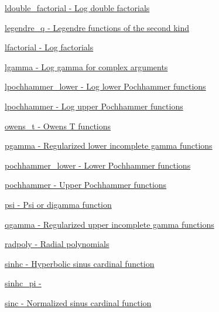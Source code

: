 \begin{DoxyItemize}
\item \hyperlink{group__gnu__math__spec__func_ga31ca8e7a5b1f5c883e727ed9c053edd8}{ldouble\+\_\+factorial -\/ Log double factorials}
\item \hyperlink{group__gnu__math__spec__func_ga4ad68133a4ff354cb99e4d3608ce6e4d}{legendre\+\_\+q -\/ Legendre functions of the second kind}
\item \hyperlink{group__gnu__math__spec__func_gaee28cc03db944a3e02fd10542016cfa8}{lfactorial -\/ Log factorials}
\item \hyperlink{group__gnu__math__spec__func_gaf70747491390b1bfc27b93ff4be6376e}{lgamma -\/ Log gamma for complex arguments}
\item \hyperlink{group__gnu__math__spec__func_ga4975d412b8e15f499a4da7b4e3f535c6}{lpochhammer\+\_\+lower -\/ Log lower Pochhammer functions}
\item \hyperlink{group__gnu__math__spec__func_ga68c4a9e8b38757a21ac54c55fe4e8dda}{lpochhammer -\/ Log upper Pochhammer functions}
\item \hyperlink{group__gnu__math__spec__func_gaa6ca4f2127c6c2101dc360673304cc2c}{owens\+\_\+t -\/ Owens T functions}
\item \hyperlink{group__gnu__math__spec__func_gaa78927de2c62e6c63f4b3506f5e1a8f6}{pgamma -\/ Regularized lower incomplete gamma functions}
\item \hyperlink{group__gnu__math__spec__func_ga306d65eeea07613a777f506ffadac509}{pochhammer\+\_\+lower -\/ Lower Pochhammer functions}
\item \hyperlink{group__gnu__math__spec__func_ga77878c3e202c7ec3d857c3fbf661001e}{pochhammer -\/ Upper Pochhammer functions}
\item \hyperlink{group__gnu__math__spec__func_gaae7574990cdbb6a637d39c2c036928c0}{psi -\/ Psi or digamma function}
\item \hyperlink{group__gnu__math__spec__func_ga3ef7aeaa55f9e7b02f02d1d605a716a6}{qgamma -\/ Regularized upper incomplete gamma functions}
\item \hyperlink{group__gnu__math__spec__func_gac44ad9bda660a21a6b297d313f0ecf48}{radpoly -\/ Radial polynomials}
\item \hyperlink{group__gnu__math__spec__func_gabafa26d8a2e592a0e080beae71ccbb7e}{sinhc -\/ Hyperbolic sinus cardinal function}
\item \hyperlink{group__gnu__math__spec__func_ga56bea42a4701761e82567f7100d9ca5e}{sinhc\+\_\+pi -\/ }
\item \hyperlink{group__gnu__math__spec__func_ga6a11b9d949ab86f9fd170dcf0d3b1251}{sinc -\/ Normalized sinus cardinal function}

\end{DoxyItemize}
